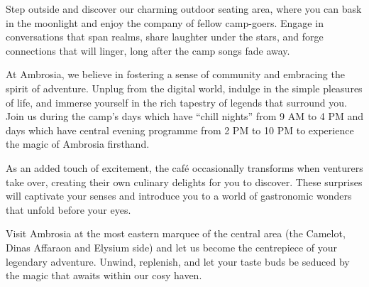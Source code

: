 \documentclass[a4paper, 11pt]{report}
\begin{document}
Step outside and discover our charming outdoor seating area, where you can bask in the moonlight and enjoy the company of fellow camp-goers. Engage in conversations that span realms, share laughter under the stars, and forge connections that will linger, long after the camp songs fade away.\nl

At Ambrosia, we believe in fostering a sense of community and embracing the spirit of adventure. Unplug from the digital world, indulge in the simple pleasures of life, and immerse yourself in the rich tapestry of legends that surround you. Join us during the camp’s days which have “chill nights” from 9 AM to 4 PM and days which have central evening programme from 2 PM to 10 PM to experience the magic of Ambrosia firsthand.\nl

As an added touch of excitement, the café occasionally transforms when venturers take over, creating their own culinary delights for you to discover. These surprises will captivate your senses and introduce you to a world of gastronomic wonders that unfold before your eyes.\nl

Visit Ambrosia at the most eastern marquee of the central area (the Camelot, Dinas Affaraon and Elysium side) and let us become the centrepiece of your legendary adventure. Unwind, replenish, and let your taste buds be seduced by the magic that awaits within our cosy haven. \nl

\backPage
\end{document}
